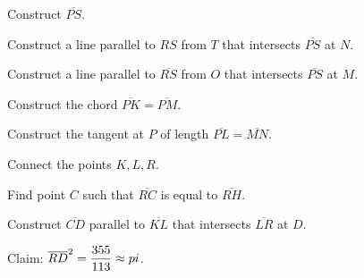 Construct $\overline{PS}$.

Construct a line parallel to $RS$ from $T$ that intersects $\overline{PS}$ at $N$.

Construct a line parallel to $\overline{RS}$ from $O$ that intersects $\overline{PS}$ at $M$.

Construct the chord $\overline{PK}=\overline{PM}$.

Construct the tangent at $P$ of length $\overline{PL}=\overline{MN}$.

Connect the points $K,L,R$.

Find point $C$ such that $\overline{RC}$ is equal to $\overline{RH}$.

Construct $\overline{CD}$ parallel to $\overline{KL}$ that intersects $\overline{LR}$ at $D$. 

Claim: $\overline{RD}^2=\displaystyle\frac{355}{113}\approx pi$.


